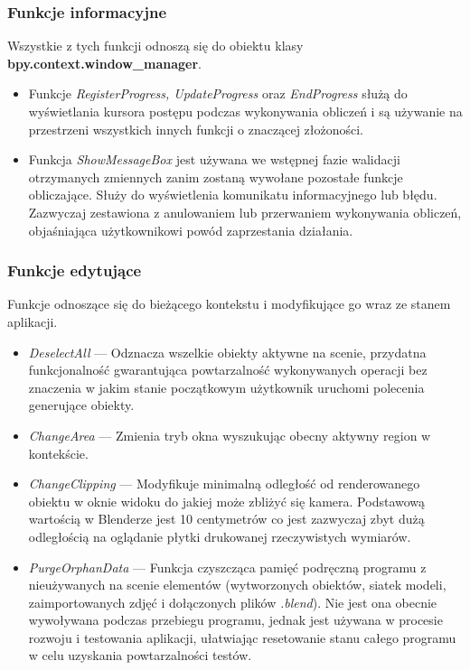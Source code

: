 \documentclass{xmgr}
\begin{document}
\subsubsection{Funkcje informacyjne}
Wszystkie z tych funkcji odnoszą się do obiektu klasy \textbf{bpy.context.window\_manager}.
\begin{itemize}
\item Funkcje \emph{RegisterProgress, UpdateProgress} oraz \emph{EndProgress} służą do wyświetlania kursora postępu podczas wykonywania obliczeń i są używanie na przestrzeni wszystkich innych funkcji o znaczącej złożoności.
\item Funkcja \emph{ShowMessageBox} jest używana we wstępnej fazie walidacji otrzymanych zmiennych zanim zostaną wywołane pozostałe funkcje obliczające. Służy do wyświetlenia komunikatu informacyjnego lub błędu. Zazwyczaj zestawiona z anulowaniem lub przerwaniem wykonywania obliczeń, objaśniająca użytkownikowi powód zaprzestania działania.
\end{itemize}
\subsubsection{Funkcje edytujące}
Funkcje odnoszące się do bieżącego kontekstu i modyfikujące go wraz ze stanem aplikacji.
\begin{itemize}
\item \emph{DeselectAll} --- Odznacza wszelkie obiekty aktywne na scenie, przydatna funkcjonalność gwarantująca powtarzalność wykonywanych operacji bez znaczenia w jakim stanie początkowym użytkownik uruchomi polecenia generujące obiekty.
\item \emph{ChangeArea} --- Zmienia tryb okna wyszukując obecny aktywny region w kontekście.
\item \emph{ChangeClipping} --- Modyfikuje minimalną odległość od renderowanego obiektu w oknie widoku do jakiej może zbliżyć się kamera. Podstawową wartością w Blenderze jest 10 centymetrów co jest zazwyczaj zbyt dużą odległością na oglądanie płytki drukowanej rzeczywistych wymiarów.
\item \emph{PurgeOrphanData} --- Funkcja czyszcząca pamięć podręczną programu z nieużywanych na scenie elementów (wytworzonych obiektów, siatek modeli, zaimportowanych zdjęć i dołączonych plików \emph{.blend}). Nie jest ona obecnie wywoływana podczas przebiegu programu, jednak jest używana w procesie rozwoju i testowania aplikacji, ułatwiając resetowanie stanu całego programu w celu uzyskania powtarzalności testów.
\end{itemize}
\end{document}
